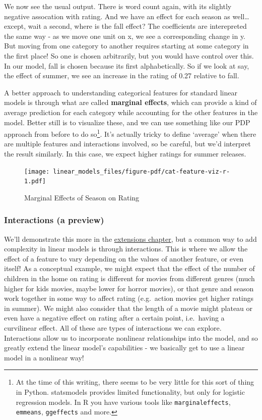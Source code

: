 \documentclass[
  letterpaper,
]{krantz}
\begin{document}
We now see the usual output. There is word count again, with its
slightly negative assocation with rating. And we have an effect for each
season as well\ldots{} except, wait a second, where is the fall effect?
The coefficients are interepreted the same way - as we move one unit on
x, we see a corresponding change in y. But moving from one category to
another requires starting at some category in the first place! So one is
chosen arbitrarily, but you would have control over this. In our model,
fall is chosen because its first alphabetically. So if we look at say,
the effect of summer, we see an increase in the rating of 0.27 relative
to fall.

A better approach to understanding categorical features for standard
linear models is through what are called \textbf{marginal effects},
which can provide a kind of average prediction for each category while
accounting for the other features in the model. Better still is to
visualize these, and we can use something like our PDP approach from
before to do so\footnote{At the time of this writing, there seems to be
  very little for this sort of thing in Python. statsmodels provides
  limited functionality, but only for logistic regression models. In R
  you have various tools like \texttt{marginaleffects},
  \texttt{emmeans}, \texttt{ggeffects} and more.}. It's actually tricky
to define `average' when there are multiple features and interactions
involved, so be careful, but we'd interpret the result similarly. In
this case, we expect higher ratings for summer releases.

\begin{figure}

{\centering \texttt{[image: linear\_models\_files/figure-pdf/cat-feature-viz-r-1.pdf]}

}

\caption{Marginal Effects of Season on Rating}

\end{figure}

\subsubsection{Interactions (a preview)}\label{interactions-a-preview}

We'll demonstrate this more in the \hyperref[extensions]{extensions
chapter}, but a common way to add complexity in linear models is through
interactions. This is where we allow the effect of a feature to vary
depending on the values of another feature, or even itself! As a
conceptual example, we might expect that the effect of the number of
children in the home on rating is different for movies from different
genres (much higher for kids movies, maybe lower for horror movies), or
that genre and season work together in some way to affect rating
(e.g.~action movies get higher ratings in summer). We might also
consider that the length of a movie might plateau or even have a
negative effect on rating after a certain point, i.e.~having a
curvilinear effect. All of these are types of interactions we can
explore. Interactions allow us to incorporate nonlinear relationships
into the model, and so greatly extend the linear model's capabilities -
we basically get to use a linear model in a nonlinear way!
\end{document}
